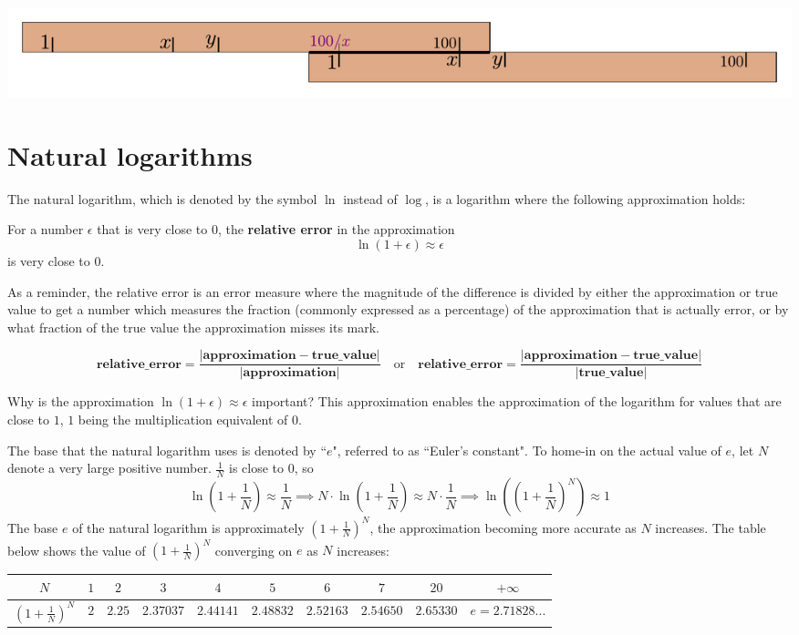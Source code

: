 \documentclass{article}
\begin{document}
\begin{center}
\includegraphics[scale = 0.5]{slide_rule_reciprocal}
\end{center} 





\section*{Natural logarithms}

The natural logarithm, which is denoted by the symbol \(\ln\) instead of \(\log\), is a logarithm where the following approximation holds:

For a number \(\epsilon\) that is very close to \(0\), the {\bf relative error} in the approximation 
\[\ln(1 + \epsilon) \approx \epsilon\]
is very close to \(0\).

As a reminder, the relative error is an error measure where the magnitude of the difference is divided by either the approximation or true value to get a number which measures the fraction (commonly expressed as a percentage) of the approximation that is actually error, or by what fraction of the true value the approximation misses its mark.

\[\textbf{relative\_error} = \frac{|\textbf{approximation} - \textbf{true\_value}|}{|\textbf{approximation}|} \quad\text{or}\quad \textbf{relative\_error} = \frac{|\textbf{approximation} - \textbf{true\_value}|}{|\textbf{true\_value}|}\]

Why is the approximation \(\ln(1 + \epsilon) \approx \epsilon\) important? This approximation enables the approximation of the logarithm for values that are close to \(1\), \(1\) being the multiplication equivalent of \(0\). 

The base that the natural logarithm uses is denoted by ``\(e\)", referred to as ``Euler's constant". To home-in on the actual value of \(e\), let \(N\) denote a very large positive number. \(\frac{1}{N}\) is close to \(0\), so 
\[\ln\left(1 + \frac{1}{N}\right) \approx \frac{1}{N} \implies N \cdot \ln\left(1 + \frac{1}{N}\right) \approx N \cdot \frac{1}{N} \implies \ln\left(\left(1 + \frac{1}{N}\right)^N\right) \approx 1\]
The base \(e\) of the natural logarithm is approximately \(\left(1 + \frac{1}{N}\right)^N\), the approximation becoming more accurate as \(N\) increases. The table below shows the value of \(\left(1 + \frac{1}{N}\right)^N\) converging on \(e\) as \(N\) increases:
\begin{tabular}{|c||c|c|c|c|c|c|c|c||c|}
\hline
\(N\)                                               & \(1\) & \(2\)      & \(3\)            & \(4\)             & \(5\)            & \(6\)            & \(7\)             & \(20\)          & \(+\infty\) \\
\hline
\(\left(1 + \frac{1}{N}\right)^N\) & \(2\) & \(2.25\) & \(2.37037\) & \(2.44141\) & \(2.48832\) & \(2.52163\) & \(2.54650\) & \(2.65330\) & \(e = 2.71828...\) \\
\hline
\end{tabular}
\end{document}
